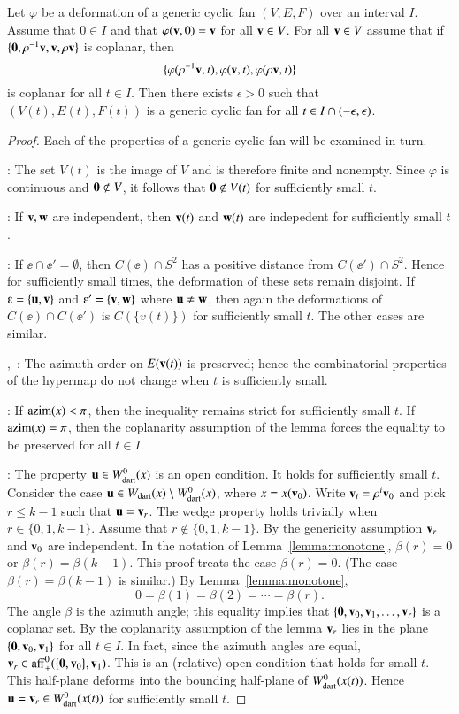 \begin{lemma}\guid{}
Let $\varphi$ be a deformation of a generic cyclic fan $(V,E,F)$ over an interval $I$.
Assume that $0\in I$ and that $\varphi({\mathbf v},0)={\mathbf v}$ for all ${\mathbf v}\in V$.
For all ${\mathbf v}\in V$ assume that if $\{{\mathbf 0},\rho^{-1}{\mathbf v},{\mathbf v},\rho{\mathbf v}\}$ is coplanar, then 
$$\{\varphi(\rho^{-1}{\mathbf v},t),\varphi({\mathbf v},t),\varphi(\rho {\mathbf v},t)\}$$
is coplanar for all $t\in I$.
Then there exists $\epsilon>0$ such that $(V(t),E(t),F(t))$
is a generic cyclic fan for all $t\in I\cap (-\epsilon,\epsilon)$.
\end{lemma}

\begin{proof} Each of the properties of a generic cyclic fan will be examined in turn.

:  The set $V(t)$ is the image of $V$ and is therefore finite and nonempty.   Since $\varphi$ is continuous and ${\mathbf 0}\not\in V$, it follows that ${\mathbf 0}\not\in V(t)$ for sufficiently small $t$.

: If ${\mathbf v},{\mathbf w}$ are independent, then ${\mathbf v}(t)$ and ${\mathbf w}(t)$ are indepedent for sufficiently small $t$.

: If $\ee \cap \ee'=\emptyset$, then $C(\ee)\cap S^2$ has a positive distance from $C(\ee')\cap S^2$.  Hence for sufficiently small times, the deformation of these sets remain disjoint.
If $\ee=\{\u,\v\}$ and $\ee'=\{\v,\w\}$ where ${\mathbf u}\ne{\mathbf w}$, then again the deformations of $C(\ee)\cap C(\ee')$ is $C(\{v(t)\})$ for sufficiently small $t$.  The other cases are similar.

,~:  The azimuth order on $E({\mathbf v}(t))$ is preserved; hence the combinatorial properties of the hypermap do not change when $t$ is sufficiently small.

: If ${\operatorname{azim}}(x)<\pi$, then the inequality remains strict for sufficiently small $t$.  If ${\operatorname{azim}}(x)=\pi$, then the coplanarity assumption of the lemma forces the equality to be preserved for all $t\in I$.

: The property ${\mathbf u}\in W^0_{\text{dart}}(x)$ is an open condition.  It holds for sufficiently small $t$. Consider the case ${\mathbf u}\in W_{\text{dart}}(x)\setminus W^0_{\text{dart}}(x)$, where $x=x({\mathbf v}_0)$.   Write ${\mathbf v}_i = \rho^i{\mathbf v}_0$ and pick $r\le k-1$ such that ${\mathbf u} = {\mathbf v}_r$.  The wedge property holds trivially when $r\in\{0,1,k-1\}$. Assume that $r\not\in\{0,1,k-1\}$. 
By the genericity assumption ${\mathbf v}_r$ and ${\mathbf v}_0$ are independent.  In the notation of Lemma~\ref{lemma:monotone},
$\beta(r) = 0$ or $\beta(r) = \beta(k-1)$.  This proof treats the case $\beta(r)=0$. (The case $\beta(r)=\beta(k-1)$ is similar.)   By Lemma~\ref{lemma:monotone}, 
$$0=\beta(1)=\beta(2)=\cdots=\beta(r).$$
The angle $\beta$ is the azimuth angle; this equality implies that $\{{\mathbf 0},{\mathbf v}_0,{\mathbf v}_1,\ldots,{\mathbf v}_r\}$ is a coplanar set.  By the coplanarity assumption of the lemma  ${\mathbf v}_r$ lies in the plane $\{{\mathbf 0},{\mathbf v}_0,{\mathbf v}_1\}$ for
all $t\in I$.  In fact, since the azimuth angles are equal, ${\mathbf v}_r\in {\operatorname{aff}}^0_+(\{{\mathbf 0},{\mathbf v}_0\},{\mathbf v}_1)$.  This
is an (relative) open condition that holds for small $t$.  This half-plane deforms into the bounding half-plane of $W^0_{\text{dart}}(x(t))$.  Hence ${\mathbf u} = {\mathbf v}_r\in W^0_{\text{dart}}(x(t))$ for sufficiently small $t$.


\end{proof}
